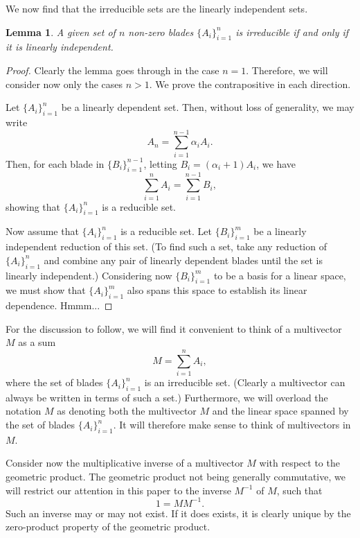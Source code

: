 \documentclass[12pt]{article}
\newtheorem{lemma}{Lemma}[section]
\begin{document}
We now find that the irreducible sets are the linearly independent sets.
\begin{lemma}
A given set of $n$ non-zero blades $\{A_i\}_{i=1}^n$ is irreducible if and only if
it is linearly independent.
\end{lemma}
\begin{proof}
Clearly the lemma goes through in the case $n=1$.  Therefore, we will consider now only the
cases $n>1$.  We prove the contrapositive in each direction.

Let $\{A_i\}_{i=1}^n$ be a linearly dependent set.  Then, without loss of generality,
we may write
\begin{equation}
A_n = \sum_{i=1}^{n-1}\alpha_i A_i.
\end{equation}
Then, for each blade in $\{B_i\}_{i=1}^{n-1}$, letting $B_i=(\alpha_i+1)A_i$, we have
\begin{equation}
\sum_{i=1}^n A_i = \sum_{i=1}^{n-1} B_i,
\end{equation}
showing that $\{A_i\}_{i=1}^n$ is a reducible set.

Now assume that $\{A_i\}_{i=1}^n$ is a reducible set.  Let $\{B_i\}_{i=1}^m$
be a linearly independent reduction of this set.  (To find such a set, take
any reduction of $\{A_i\}_{i=1}^n$ and combine any pair of linearly
dependent blades until the set is linearly independent.)  Considering now
$\{B_i\}_{i=1}^m$ to be a basis for a linear space, we must show
that $\{A_i\}_{i=1}^m$ also spans this space to establish its linear dependence.
Hmmm...
\end{proof}

For the discussion to follow, we will find it convenient to think of a
multivector $M$ as a sum
\begin{equation}
M = \sum_{i=1}^n A_i,
\end{equation}
where the set of blades $\{A_i\}_{i=1}^n$ is an irreducible set.
(Clearly a multivector can always be written in terms of such a set.)
Furthermore, we will overload the notation $M$ as denoting
both the multivector $M$ and the linear space spanned by
the set of blades $\{A_i\}_{i=1}^n$.  It will therefore
make sense to think of multivectors in $M$.

Consider now the multiplicative inverse of a multivector $M$ with
respect to the geometric product.  The geometric product not being
generally commutative, we will restrict our attention in this paper to the inverse $M^{-1}$
of $M$, such that
\begin{equation}\label{equ_m_m_inv}
1=MM^{-1}.
\end{equation}
Such an inverse may or may not exist.
If it does exists, it is clearly unique by the zero-product property of the geometric product.
\end{document}
